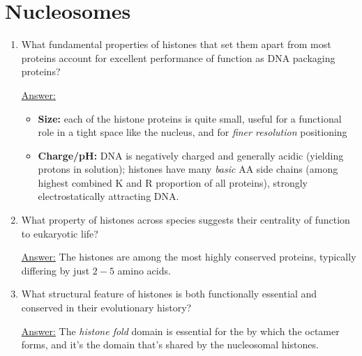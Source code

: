 \documentclass{article}
\newenvironment{QandA}{\begin{enumerate}[label=\bfseries Q\arabic*.]}
                       {\end{enumerate}}
\newenvironment{answered}{\par\normalfont\underline{Answer:}}{}
\begin{document}
\section{Nucleosomes}
\begin{QandA}
  \item{What fundamental properties of histones that set them apart from most proteins account for excellent performance of function as DNA packaging proteins?}
    \begin{answered}
    \begin{itemize}
      \item{\textbf{Size:} each of the histone proteins is quite small, useful for a functional role in a tight space like the nucleus, and for \textit{finer resolution} positioning}
      \item{\textbf{Charge/pH:} DNA is negatively charged and generally acidic (yielding protons in solution); histones have many \textit{basic} AA side chains (among highest combined K and R proportion of all proteins), strongly electrostatically attracting DNA.}
    \end{itemize}
    \end{answered}
  \item{What property of histones across species suggests their centrality of function to eukaryotic life?}
    \begin{answered}
    The histones are among the most highly conserved proteins, typically differing by just $2-5$ amino acids.
    \end{answered}
  \item{What structural feature of histones is both functionally essential and conserved in their evolutionary history?}
    \begin{answered}
    The \textit{histone fold} domain is essential for the  by which the octamer forms, and it's the domain that's shared by the nucleosomal histones.
    \end{answered}
\end{QandA}
\end{document}
